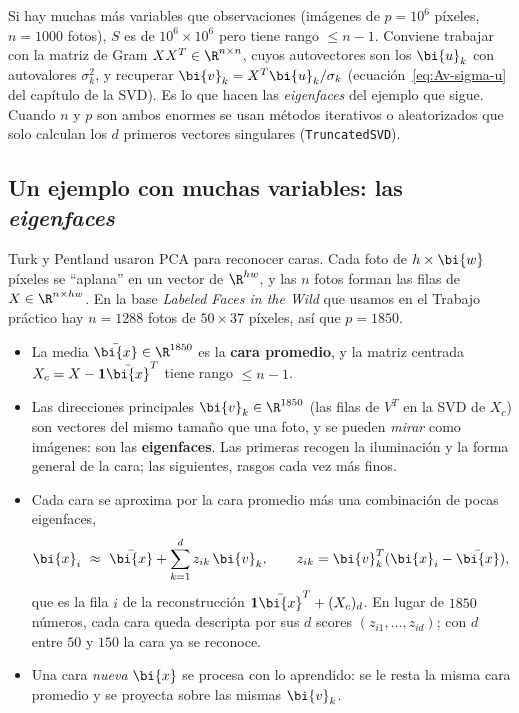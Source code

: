 \begin{remark}\label{pca-rem:gram}
Si hay muchas más variables que observaciones (imágenes de $p=10^6$ píxeles,
$n=1000$ fotos), $S$ es de $10^6\times10^6$ pero tiene rango $\le n-1$.
Conviene trabajar con la matriz de Gram $XX^T\in\R^{n\times n}$, cuyos
autovectores son los $\bi{u}_k$ con autovalores $\sigma_k^2$, y recuperar
$\bi{v}_k=X^T \bi{u}_k/\sigma_k$ (ecuación~\eqref{eq:Av-sigma-u} del capítulo de la
SVD). Es lo
que hacen las \emph{eigenfaces} del ejemplo que sigue. Cuando $n$ y $p$ son
ambos enormes se usan métodos iterativos o aleatorizados que solo calculan los
$d$ primeros vectores singulares (\texttt{TruncatedSVD}).
\end{remark}

\subsection{Un ejemplo con muchas variables: las \emph{eigenfaces}}\label{pca-sec:eigenfaces}

Turk y Pentland \cite{TurkPentland1991} usaron PCA para reconocer caras.
Cada foto de $h\times \bi{w}$ píxeles se ``aplana'' en un vector de $\R^{hw}$, y las
$n$ fotos forman las filas de $X\in\R^{n\times hw}$. En la base \emph{Labeled
Faces in the Wild} que usamos en el Trabajo práctico hay $n=1288$ fotos de
$50\times37$ píxeles, así que $p=1850$.
\begin{itemize}[leftmargin=*,itemsep=1pt]
\item La media $\bar{\bi{x}}\in\R^{1850}$ es la \textbf{cara promedio}, y la matriz
centrada $X_c=X-\mathbf 1\bar{\bi{x}}^T$ tiene rango $\le n-1$.
\item Las direcciones principales $\bi{v}_k\in\R^{1850}$ (las filas de $V^T$ en
la SVD de $X_c$) son vectores del mismo tamaño que una foto, y se pueden
\emph{mirar} como imágenes: son las \textbf{eigenfaces}. Las primeras
recogen la iluminación y la forma general de la cara; las siguientes, rasgos
cada vez más finos.
\item Cada cara se aproxima por la cara promedio más una combinación de
pocas eigenfaces,
\[
\bi{x}_i\ \approx\ \bar{\bi{x}}+\sum_{k=1}^dz_{ik}\,\bi{v}_k ,\qquad z_{ik}=\bi{v}_k^T(\bi{x}_i-\bar{\bi{x}}),
\]
que es la fila $i$ de la reconstrucción $\mathbf 1\bar{\bi{x}}^T+(X_c)_d$. En
lugar de $1850$ números, cada cara queda descripta por sus $d$ scores
$(z_{i1},\dots,z_{id})$; con $d$ entre $50$ y $150$ la cara ya se reconoce.
\item Una cara \emph{nueva} $\bi{x}$ se procesa con lo aprendido: se le resta la
misma cara promedio y se proyecta sobre las mismas $\bi{v}_k$.
\end{itemize}

